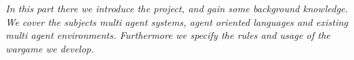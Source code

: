 \textit{In this part there we introduce the project, and gain some background knowledge. We cover the subjects multi agent systems, agent oriented languages and existing multi agent environments. Furthermore we specify the rules and usage of the wargame we develop.} \\ \\